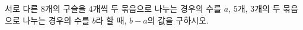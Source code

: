 \hspace*{2mm}\begin{minipage}[t]{\dimexpr\linewidth-2mm\relax}\vspace{0pt}
서로 다른 $8$개의 구슬을 $4$개씩 두 묶음으로 나누는 경우의 수를 $a$, $5$개, $3$개의 두 묶음으로 나누는 경우의 수를 $b$라 할 때, $b-a$의 값을 구하시오.\end{minipage}
